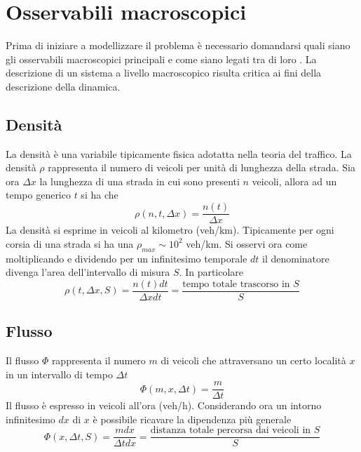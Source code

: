 \documentclass[../main.tex]{subfiles}
\begin{document}
\section{Osservabili macroscopici}
Prima di iniziare a modellizzare il problema \`e necessario domandarsi quali siano gli osservabili macroscopici principali e come siano legati tra di loro \cite{H111}.
La descrizione di un sistema a livello macroscopico risulta critica ai fini della descrizione della dinamica.
\subsection{Densit\`a}
La densit\`a \`e una variabile tipicamente fisica adotatta nella teoria del traffico.
La densit\`a $\rho$ rappresenta il numero di veicoli per unit\`a di lunghezza della strada.
Sia ora $\Delta x$ la lunghezza di una strada in cui sono presenti $n$ veicoli, allora ad un tempo generico $t$ si ha che
\begin{equation*}
    \rho(n,t,\Delta x)=\frac{n(t)}{\Delta x}
\end{equation*}
La densit\`a si esprime in veicoli al kilometro (veh/km).
Tipicamente per ogni corsia di una strada si ha una $\rho_{max}\sim 10^2$ veh/km.
Si osservi ora come moltiplicando e dividendo per un infinitesimo temporale $dt$ il denominatore divenga l'area dell'intervallo di misura $S$.
In particolare
\begin{equation}
    \rho(t,\Delta x, S)=\frac{n(t)dt}{\Delta x dt}=\frac{\mbox{tempo totale trascorso in }S}{S}
    \label{eq:rho_s}
\end{equation}

\subsection{Flusso}
Il flusso $\Phi$ rappresenta il numero $m$ di veicoli che attraversano un certo localit\`a $x$ in un intervallo di tempo $\Delta t$
\begin{equation}
    \Phi(m, x, \Delta t)=\frac{m}{\Delta t}
\end{equation}
Il flusso \`e espresso in veicoli all'ora (veh/h).
Considerando ora un intorno infinitesimo $dx$ di $x$ \`e possibile ricavare la dipendenza più generale
\begin{equation}
    \Phi(x, \Delta t, S)=\frac{mdx}{\Delta t dx}=\frac{\mbox{distanza totale percorsa dai veicoli in }S}{S}
    \label{eq:phi_s}
\end{equation}
\end{document}
